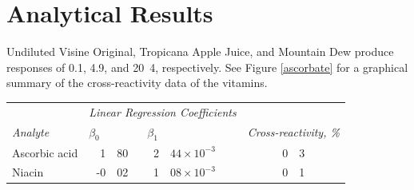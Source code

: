 \documentclass[article,11pt,oneside]{memoir}
\begin{document}
\section{Analytical Results}
Undiluted Visine Original, Tropicana Apple Juice, and Mountain Dew produce responses of 0.1, 4.9, and \unit{20.4}{\milli\gram\per\deci\liter}, respectively.
See Figure \ref{ascorbate} for a graphical summary of the cross-reactivity data of the vitamins.
\begin{center}
\begin{tabular}{lr@{.}lr@{.}lr@{.}l}
\toprule
 & \multicolumn{4}{c}{\em Linear Regression Coefficients} & \multicolumn{2}{l}{} \tabularnewline\cmidrule(lr){2-5}
{\em Analyte} & \multicolumn{2}{l}{\(\beta_0\)} & \multicolumn{2}{l}{\(\beta_1\)} & \multicolumn{2}{l}{{\em Cross-reactivity, \%}} \tabularnewline\midrule
Ascorbic acid & 1 & 80 & 2 & \(44\times 10^{-3}\) & 0 & 3 \tabularnewline
Niacin & -0 & 02 & 1 & \(08\times 10^{-3}\) & 0 & 1 \tabularnewline
\bottomrule
\end{tabular}
\end{center}
\end{document}
